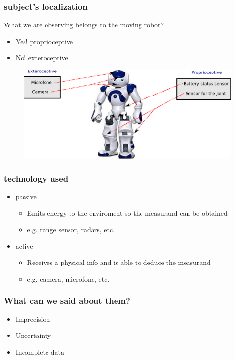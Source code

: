 \documentclass{beamer}
\begin{document}
	\begin{frame}
		\frametitle{subject's localization}
		What we are observing belongs to the moving robot?
		\begin{itemize}
		\item Yes! proprioceptive
		\item No! exteroceptive
		\end{itemize}
		\begin{figure}[h]
			\center
			\includegraphics[scale=0.51]{img/fig:nao:config}
		 \end{figure}		
	\end{frame}

	\begin{frame}
		\frametitle{technology used}
		\begin{itemize}
		\item passive
			\begin{itemize}
				\item Emits energy to the enviroment so the measurand can be obtained
				\item e.g. range sensor, radars, etc.
			\end{itemize}		
		\item active
			\begin{itemize}
				\item Receives a physical info and is able to deduce the measurand
				\item e.g. camera, microfone, etc. 
			\end{itemize}		
		\end{itemize}		
		
	\end{frame}
	
	\begin{frame}
		\frametitle{What can we said about them?}

		\begin{itemize}
			\item Imprecision
			\item Uncertainty
			\item Incomplete data
		\end{itemize}		
		
	\end{frame}
\end{document}
